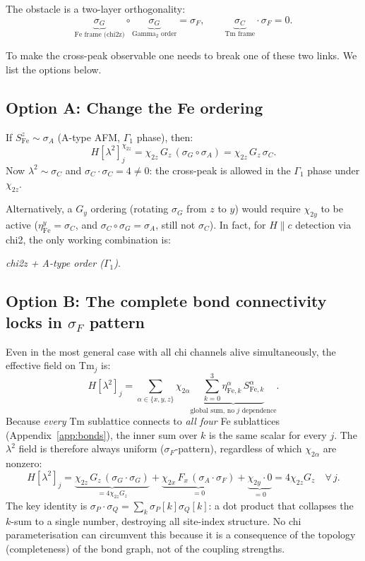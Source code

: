 \documentclass[11pt,a4paper]{article}
\newcommand{\sF}{\sigma_F}
\newcommand{\sG}{\sigma_G}
\newcommand{\sA}{\sigma_A}
\newcommand{\sC}{\sigma_C}
\newcommand{\etay}{\eta^y}
\newcommand{\lamt}{\lambda^2}
\begin{document}
The obstacle is a two-layer orthogonality:
\begin{equation}
  \underbrace{\sG}_{\text{Fe frame (chi2z)}}
  \circ
  \underbrace{\sG}_{\text{Gamma}_2\text{ order}}
  = \sF,
  \qquad
  \underbrace{\sC}_{\text{Tm frame}} \cdot \sF = 0.
\end{equation}

To make the cross-peak observable one needs to break one of these two links.
We list the options below.

\subsection*{Option A: Change the Fe ordering}

If $S^z_{\mathrm{Fe}} \sim \sA$ (A-type AFM, $\Gamma_1$ phase), then:
\begin{equation}
  H[\lamt]_j^{\chi_{2z}} = \chi_{2z}\,G_z\,(\sG\circ\sA)
                           = \chi_{2z}\,G_z\,\sC.
\end{equation}
Now $\lamt \sim \sC$ and $\sC\cdot\sC = 4 \neq 0$: the cross-peak is allowed
in the $\Gamma_1$ phase under $\chi_{2z}$.

Alternatively, a $G_y$ ordering (rotating $\sG$ from $z$ to $y$) would require
$\chi_{2y}$ to be active ($\etay_{\mathrm{Fe}} = \sC$, and $\sC\circ\sG = \sA$,
still not $\sC$).  In fact, for $H\parallel c$ detection via chi2, the only
working combination is:
\begin{center}
\textit{chi2z + A-type order ($\Gamma_1$)}.
\end{center}

\subsection*{Option B: The complete bond connectivity locks in $\sF$ pattern}

Even in the most general case with all chi channels alive simultaneously, the
effective field on Tm$_j$ is:
\begin{equation}
  H[\lamt]_j = \sum_{\alpha\in\{x,y,z\}}\chi_{2\alpha}
               \underbrace{\sum_{k=0}^{3}\eta^\alpha_{\mathrm{Fe},k}\,S^\alpha_{\mathrm{Fe},k}}_{\text{global sum, no $j$ dependence}}.
  \label{eq:fullH}
\end{equation}
Because \emph{every} Tm sublattice connects to \emph{all four} Fe sublattices
(Appendix~\ref{app:bonds}), the inner sum over $k$ is the same scalar for
every $j$.  The $\lamt$ field is therefore always uniform ($\sF$-pattern),
regardless of which $\chi_{2\alpha}$ are nonzero:
\begin{equation}
  H[\lamt]_j = \underbrace{\chi_{2z}\,G_z\,(\sG\cdot\sG)}_{=4\chi_{2z}G_z}
             + \underbrace{\chi_{2x}\,F_x\,(\sA\cdot\sF)}_{=0}
             + \underbrace{\chi_{2y}\cdot 0}_{=0}
             = 4\chi_{2z}G_z \quad \forall\,j.
\end{equation}
The key identity is $\sigma_P\cdot\sigma_Q = \sum_k\sigma_P[k]\sigma_Q[k]$:
a dot product that collapses the $k$-sum to a single number,
destroying all site-index structure.  No chi parameterisation can circumvent
this because it is a consequence of the topology (completeness) of the bond graph,
not of the coupling strengths.
\end{document}
